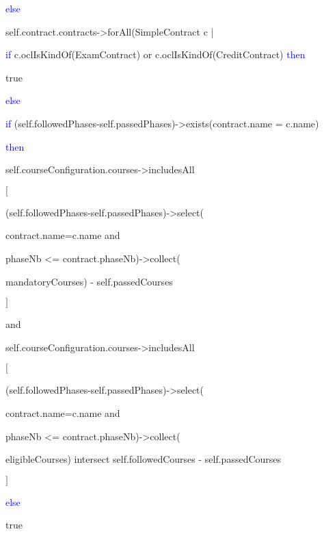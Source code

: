 \begin{enumerate}
	 \par \hspace*{5 mm} \textcolor{Blue}{else}
	 \par \hspace*{10 mm} self.contract.contracts->forAll(SimpleContract c |
	 \par \hspace*{15 mm} \textcolor{Blue}{if} c.oclIsKindOf(ExamContract) or
	 c.oclIsKindOf(CreditContract) \textcolor{Blue}{then}
	 \par \hspace*{20 mm} true
	 \par \hspace*{15 mm} \textcolor{Blue}{else}
	 \par \hspace*{20 mm} \textcolor{Blue}{if}
	 (self.followedPhases-self.passedPhases)->exists(contract.name = c.name)
	\par \hspace*{20 mm} \textcolor{Blue}{then}
	 \par \hspace*{25 mm} self.courseConfiguration.courses->includesAll
	 \par \hspace*{25 mm} $[$
	 \par \hspace*{27 mm} (self.followedPhases-self.passedPhases)->select(
	 \par \hspace*{27 mm} contract.name=c.name and 
	 \par \hspace*{27 mm} phaseNb <= contract.phaseNb)->collect(
	 \par \hspace*{27 mm}  mandatoryCourses) - self.passedCourses
	 \par \hspace*{25 mm} $]$
	 \par \hspace*{25 mm} and
	 \par \hspace*{25 mm} self.courseConfiguration.courses->includesAll
	 \par \hspace*{25 mm} $[$
	 \par \hspace*{27 mm} (self.followedPhases-self.passedPhases)->select(
	 \par \hspace*{27 mm} contract.name=c.name and 
	 \par \hspace*{27 mm} phaseNb <= contract.phaseNb)->collect(
	 \par \hspace*{27 mm}  eligibleCourses) intersect self.followedCourses -
	 self.passedCourses 
	 \par \hspace*{25 mm} $]$
	 \par \hspace*{20 mm} \textcolor{Blue}{else}
	 \par \hspace*{25 mm} true
	 

\end{enumerate}
